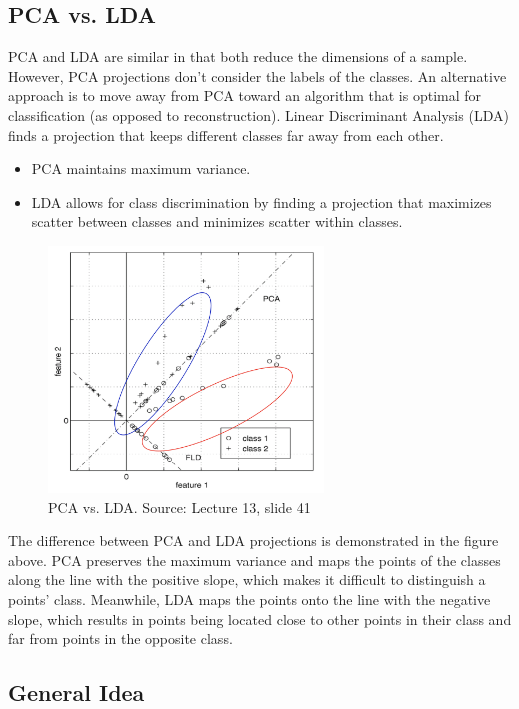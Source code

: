 \documentclass{article}
\begin{document}
\subsection{PCA vs. LDA}
PCA and LDA are similar in that both reduce the dimensions of a sample. However, PCA projections don't consider the labels of the classes. An alternative approach is to move away from PCA toward an algorithm that is optimal for classification (as opposed to reconstruction). Linear Discriminant Analysis (LDA) finds a projection that keeps different classes far away from each other.
\begin{itemize}
	\item PCA maintains maximum variance.
    \item LDA allows for class discrimination by finding a  projection that maximizes scatter between classes and minimizes scatter within classes.
\end{itemize}

\begin{figure}[H]
  \centering
  \includegraphics[width=0.65\textwidth]{pca-vs-lda}
  \caption{PCA vs. LDA. Source: Lecture 13, slide 41}
\end{figure}

The difference between PCA and LDA projections is demonstrated in the figure above. PCA preserves the maximum variance and maps the points of the classes along the line with the positive slope, which makes it difficult to distinguish a points' class. Meanwhile, LDA maps the points onto the line with the negative slope, which results in points being located close to other points in their class and far from points in the opposite class.

\subsection{General Idea}
\end{document}
